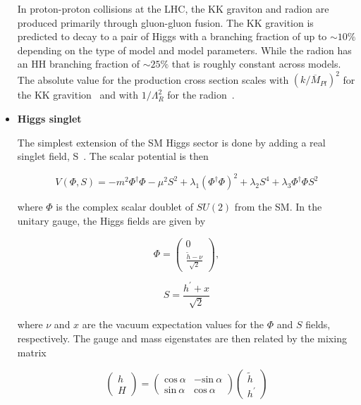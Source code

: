 \begin{itemize}[wide, labelwidth=!, labelindent=0pt]
In proton-proton collisions at the LHC, the KK graviton and radion are produced primarily through gluon-gluon fusion. The KK gravition is predicted to decay to a pair of Higgs with a branching fraction of up to ${\sim}10\%$ depending on the type of model and model parameters. While the radion has an HH branching fraction of ${\sim}25\%$ that is roughly constant across models. The absolute value for the production cross section scales with $(k/\overline{M}_{Pl})^{2}$ for the KK gravition~\cite{GravitionXS} and with $1/\Lambda_{R} ^{2}$ for the radion~\cite{RadionXS}. 

\item[ ]
\textbf{Higgs singlet}

\indent
The simplest extension of the SM Higgs sector is done by adding a real singlet field, S~\cite{HiggsSinglet}. The scalar potential is then

\begin{equation}
V(\Phi,S)= -m^{2}\Phi^{\dag}\Phi -\mu^{2}S^{2}+\lambda_{1}(\Phi^{\dag}\Phi)^{2}+\lambda_{2}S^{4}+\lambda_{3}\Phi^{\dag}\Phi S^{2}
\end{equation}

\noindent
where $\Phi$ is the complex scalar doublet of $SU(2)$ from the SM. In the unitary gauge, the Higgs fields are given by

\begin{equation}
\Phi = 
\begin{pmatrix}
0\\
\frac{\widetilde{h}-\nu}{\sqrt{2}}
\end{pmatrix},
\end{equation}

\begin{equation}
S= \frac{h^{\prime}+x}{\sqrt{2}}
\end{equation}

\noindent
where $\nu$ and $x$ are the vacuum expectation values for the $\Phi$ and $S$ fields, respectively. The gauge and mass eigenstates are then related by the mixing matrix

\begin{equation}
\begin{pmatrix}
h\\
H
\end{pmatrix}
= 
\begin{pmatrix}
\mathrm{cos}\: \alpha & -\mathrm{sin}\: \alpha \\
\mathrm{sin}\: \alpha & \mathrm{cos}\:\alpha
\end{pmatrix}
\begin{pmatrix}
\widetilde{h}\\
h^{\prime}
\end{pmatrix}
\end{equation} 


\end{itemize}
